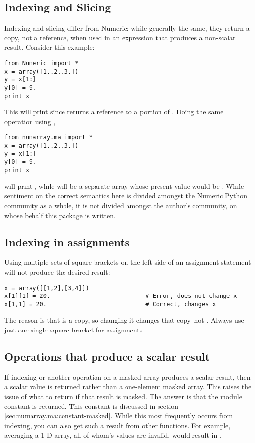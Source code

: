 \subsection{Indexing and Slicing}
\label{sec:numarray.ma:indexing-slicing}

Indexing and slicing differ from Numeric: while generally the same, they return
a copy, not a reference, when used in an expression that produces a non-scalar
result. Consider this example:
\begin{verbatim}
from Numeric import *
x = array([1.,2.,3.])
y = x[1:]
y[0] = 9.
print x
\end{verbatim}
This will print \code{[1., 9., 3.]} since  returns a reference to a
portion of .  Doing the same operation using ,
\begin{verbatim}
from numarray.ma import *
x = array([1.,2.,3.])
y = x[1:]
y[0] = 9.
print x
\end{verbatim}
will print \code{[1., 2., 3.]}, while  will be a separate array whose
present value would be \code{[9., 3.]}. While sentiment on the correct
semantics here is divided amongst the Numeric Python community as a whole, it
is not divided amongst the author's community, on whose behalf this package is
written.


\subsection{Indexing in assignments}
\label{sec:numarray.ma:indexing-assignments}

Using multiple sets of square brackets on the left side of an assignment
statement will not produce the desired result:
\begin{verbatim}
x = array([[1,2],[3,4]])
x[1][1] = 20.                           # Error, does not change x
x[1,1] = 20.                            # Correct, changes x
\end{verbatim}
The reason is that  is a copy, so changing it changes that copy, not
.  Always use just one single square bracket for assignments.


\subsection{Operations that produce a scalar result}
\label{sec:numarray.ma:operations-producing-scalars}

If indexing or another operation on a masked array produces a scalar result,
then a scalar value is returned rather than a one-element masked array. This
raises the issue of what to return if that result is masked. The answer is that
the module constant
 is returned. This
constant is discussed in section \ref{sec:numarray.ma:constant-masked}.  While
this most frequently occurs from indexing, you can also get such a result from
other functions. For example, averaging a 1-D array, all of whom's values are
invalid, would result in .


